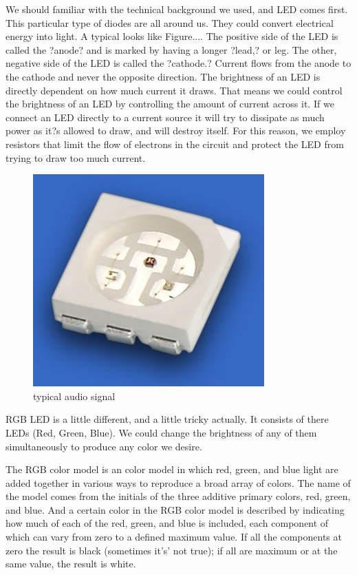 \documentclass[12pt,a4paper,journal]{IEEEtran}
\begin{document}
We should familiar with the technical background we used, and LED comes first. This particular type of diodes are all around us. They could convert electrical energy into light. A typical looks like Figure.... The positive side of the LED is called the ?anode? and is marked by having a longer ?lead,? or leg. The other, negative side of the LED is called the ?cathode.? Current flows from the anode to the cathode and never the opposite direction. The brightness of an LED is directly dependent on how much current it draws. That means we could control the brightness of an LED by controlling the amount of current across it. If we connect an LED directly to a current source it will try to dissipate as much power as it?s allowed to draw, and will destroy itself. For this reason, we employ resistors that limit the flow of electrons in the circuit and protect the LED from trying to draw too much current.
\begin{figure}[ht]
  \centering
  \includegraphics[width=0.9\linewidth]{rgbled.jpg}
  \caption{typical audio signal}
  \label{fig:tas2}
\end{figure}
RGB LED is a little different, and a little tricky actually. It consists of there LEDs (Red, Green, Blue). We could change the brightness of any of them simultaneously to produce any color we desire.

The RGB color model is an color model in which red, green, and blue light are added together in various ways to reproduce a broad array of colors. The name of the model comes from the initials of the three additive primary colors, red, green, and blue. And a certain color in the RGB color model is described by indicating how much of each of the red, green, and blue is included, each component of which can vary from zero to a defined maximum value. If all the components at zero the result is black (sometimes it's' not true); if all are maximum or at the same value, the result is white. 
\end{document}

